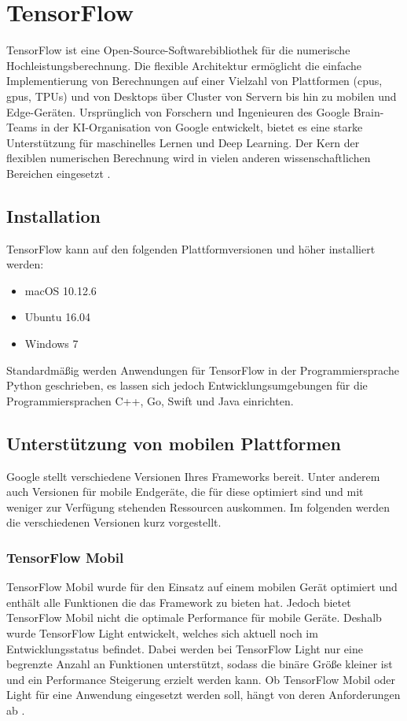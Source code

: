 \section{TensorFlow}\label{sec:tensorflow}
TensorFlow ist eine Open-Source-Softwarebibliothek für die numerische Hochleistungsberechnung. Die flexible Architektur ermöglicht die einfache Implementierung von Berechnungen auf einer Vielzahl von Plattformen (\ac{cpu}s, \ac{gpu}s, TPUs) und von Desktops über Cluster von Servern bis hin zu mobilen und Edge-Geräten. Ursprünglich von Forschern und Ingenieuren des Google Brain-Teams in der KI-Organisation von Google entwickelt, bietet es eine starke Unterstützung für maschinelles Lernen und Deep Learning. Der Kern der flexiblen numerischen Berechnung wird in vielen anderen wissenschaftlichen Bereichen eingesetzt \cite{tensorflow}.

\subsection{Installation}
TensorFlow kann auf den folgenden Plattformversionen und höher installiert werden: 
\begin{itemize}
	\item macOS 10.12.6 
	\item Ubuntu 16.04 
	\item Windows 7 
\end{itemize}

Standardmäßig werden Anwendungen für TensorFlow in der Programmiersprache Python geschrieben, es lassen sich jedoch Entwicklungsumgebungen für die Programmiersprachen C++, Go, Swift und Java einrichten.

\subsection{Unterstützung von mobilen Plattformen}
Google stellt verschiedene Versionen Ihres Frameworks bereit. Unter anderem auch Versionen für mobile Endgeräte, die für diese optimiert sind und mit weniger zur Verfügung stehenden Ressourcen auskommen. Im folgenden werden die verschiedenen Versionen kurz vorgestellt.

\subsubsection{TensorFlow Mobil}
TensorFlow Mobil wurde für den Einsatz auf einem mobilen Gerät optimiert und enthält alle Funktionen die das Framework zu bieten hat. Jedoch bietet TensorFlow Mobil nicht die optimale Performance für mobile Geräte. Deshalb wurde TensorFlow Light entwickelt, welches sich aktuell noch im Entwicklungsstatus befindet. Dabei werden bei TensorFlow Light nur eine begrenzte Anzahl an Funktionen unterstützt, sodass die binäre Größe kleiner ist und ein Performance Steigerung erzielt werden kann. Ob TensorFlow Mobil oder Light für eine Anwendung eingesetzt werden soll, hängt von deren Anforderungen ab \cite{tensorflow}. 

